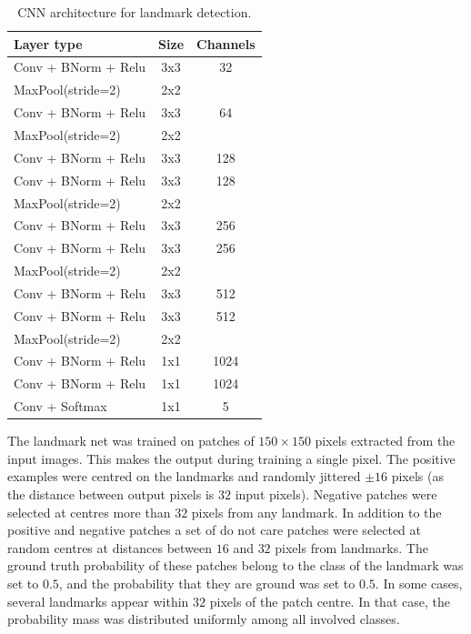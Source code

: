 \documentclass{cta-author}
\begin{document}
\begin{table}
\begin{center}
\begin{tabular}{|l|c|c|}
\hline
\textbf{Layer type} & \textbf{Size} & \textbf{Channels} \\
\hline

Conv + BNorm + Relu & 3x3 & 32 \\
MaxPool(stride=2) & 2x2 &  \\
\hline

Conv + BNorm + Relu & 3x3 & 64 \\
MaxPool(stride=2) & 2x2 &  \\
\hline

Conv + BNorm + Relu & 3x3 & 128 \\
Conv + BNorm + Relu & 3x3 & 128 \\
MaxPool(stride=2) & 2x2 &  \\
\hline

Conv + BNorm + Relu & 3x3 & 256 \\
Conv + BNorm + Relu & 3x3 & 256 \\
MaxPool(stride=2) & 2x2 &  \\
\hline

Conv + BNorm + Relu & 3x3 & 512 \\
Conv + BNorm + Relu & 3x3 & 512 \\
MaxPool(stride=2) & 2x2 &  \\
\hline

Conv + BNorm + Relu & 1x1 & 1024 \\
Conv + BNorm + Relu & 1x1 & 1024 \\
Conv + Softmax & 1x1 & 5 \\
\hline

\end{tabular}
\end{center}
\caption{CNN architecture for landmark detection. 
}
\label{tab:cownet}
\end{table}

The landmark net was trained on patches of $150\times 150$ pixels extracted from the input images. This makes the output during training a single pixel. The positive examples were centred on the landmarks and randomly jittered $\pm 16$ pixels (as the distance between output pixels is $32$ input pixels). Negative patches were selected at centres more than $32$ pixels from any landmark. In addition to the positive and negative patches a set of do not care patches were selected at random centres at distances between $16$ and $32$ pixels from landmarks. The ground truth probability of these patches belong to the class of the landmark was set to $0.5$, and the probability that they are ground was set to $0.5$. In some cases, several landmarks appear within $32$ pixels of the patch centre. In that case, the probability mass was distributed uniformly among all involved classes.
\end{document}
